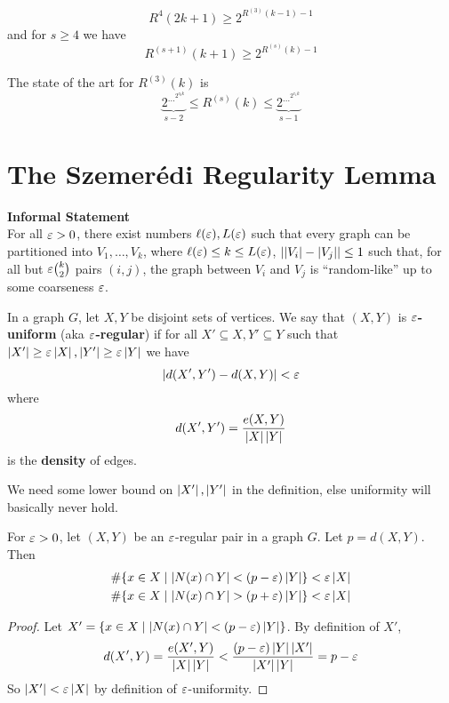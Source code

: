 \documentclass{article}
\begin{document}
\begin{thm}
  $$R^{4}(2k + 1) \ge 2^{R^{(3)}(k - 1) - 1}$$
  and for $s \ge 4$ we have
  $$R^{(s + 1)}(k + 1) \ge 2^{R^{(s)}(k) - 1}$$
\end{thm}

The state of the art for $R^{(3)}(k)$ is
$$\underbrace{2^{\dots^{2^{c_0 k}}}}_{s - 2} \le R^{(s)}(k) \le \underbrace{2^{\dots^{2^{c_1 k}}}}_{s - 1}$$


\section{The Szemerédi Regularity Lemma}

{\bf Informal Statement} \\
For all $\varepsilon > 0$, there exist numbers $\ell(\varepsilon), L(\varepsilon)$ such that every graph can be partitioned into $V_1, \dots, V_k$, where $\ell(\varepsilon) \le k \le L(\varepsilon)$, $\left\lvert \left\lvert V_i\right\rvert - \left\lvert V_j\right\rvert\right\rvert \le 1$ such that, for all but $\varepsilon\binom k2$ pairs $(i, j)$, the graph between $V_i$ and $V_j$ is ``random-like'' up to some coarseness $\varepsilon$.

\begin{dfn}
  In a graph $G$, let $X, Y$ be disjoint sets of vertices. We say that $(X, Y)$ is {\bf $\varepsilon$-uniform} (aka {\bf $\varepsilon$-regular}) if for all $X' \subseteq X, Y' \subseteq Y$ such that $\left\lvert X'\right\rvert \ge \varepsilon\left\lvert X\right\rvert, \left\lvert Y'\right\rvert \ge \varepsilon\left\lvert Y\right\rvert$ we have
  $$\left\lvert d(X', Y') - d(X, Y)\right\rvert < \varepsilon$$
  where
  $$d(X', Y') = \frac{e(X, Y)}{\left\lvert X\right\rvert\left\lvert Y\right\rvert}$$
  is the {\bf density} of edges.
\end{dfn}

\begin{rmk}
  We need some lower bound on $\left\lvert X'\right\rvert, \left\lvert Y'\right\rvert$ in the definition, else uniformity will basically never hold.
\end{rmk}

\newlec

\begin{prop}
  For $\varepsilon > 0$, let $(X, Y)$ be an $\varepsilon$-regular pair in a graph $G$. Let $p = d(X, Y)$. Then
  \begin{align*}
    \#\{x \in X \mid \left\lvert N(x) \cap Y\right\rvert < (p - \varepsilon)\left\lvert Y\right\rvert\} & < \varepsilon\left\lvert X\right\rvert \\
    \#\{x \in X \mid \left\lvert N(x) \cap Y\right\rvert > (p + \varepsilon)\left\lvert Y\right\rvert\} & < \varepsilon\left\lvert X\right\rvert
  \end{align*}
\end{prop}
\begin{proof}
  Let $X' = \{x \in X \mid \left\lvert N(x) \cap Y\right\rvert < (p - \varepsilon)\left\lvert Y\right\rvert\}$. By definition of $X'$,
  $$d(X', Y) = \frac{e(X', Y)}{\left\lvert X\right\rvert\left\lvert Y\right\rvert} < \frac{(p - \varepsilon)\left\lvert Y\right\rvert\left\lvert X'\right\rvert}{\left\lvert X'\right\rvert\left\lvert Y\right\rvert} = p - \varepsilon$$
  So $\left\lvert X'\right\rvert < \varepsilon\left\lvert X\right\rvert$ by definition of $\varepsilon$-uniformity.
\end{proof}
\end{document}
